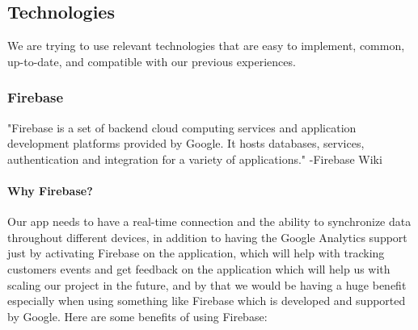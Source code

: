 \documentclass[a4paper, 12pt]{article} %
\begin{document}
        \subsection{Technologies}
            We are trying to use relevant technologies that are easy to implement, common, up-to-date, and compatible with our previous experiences.
            \subsubsection{Firebase}
                "Firebase is a set of backend cloud computing services and application development platforms provided by Google. It hosts databases, services, authentication and integration for a variety of applications." -Firebase Wiki \cite{firebase_wiki}
                
                \paragraph{Why Firebase?} 
                
                Our app needs to have a real-time connection and the ability to synchronize data throughout different devices, in addition to having the Google Analytics support just by activating Firebase on the application, which will help with tracking customers events and get feedback on the application which will help us with scaling our project in the future, and by that we would be having a  huge benefit especially when using something like Firebase which is developed and supported by Google. Here are some benefits of using Firebase:
                
\end{document}
